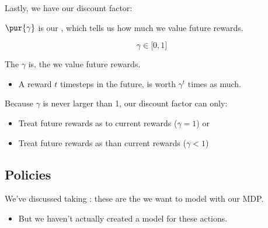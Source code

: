         Lastly, we have our discount factor:
            \\

        \begin{definition}
            $\pur{\gamma}$ is our , which tells us how much we value future rewards.

            \begin{equation*}
                \gamma \in \Big[ 0,1 \Big]
            \end{equation*}

            The  $\gamma$ is, the  we value future rewards.

            \begin{itemize}
                \item A reward $t$ timesteps in the future, is worth $\gamma^t$ times as much.
            \end{itemize}

            \subsecdiv

            Because $\gamma$ is never larger than 1, our discount factor can only:

            \begin{itemize}
                \item Treat future rewards as  to current rewards ($\gamma=1$) or

                \item Treat future rewards as  than current rewards ($\gamma<1$)
            \end{itemize}
        \end{definition}

    \pagebreak

    

    \subsection{Policies}

        We've discussed taking : these are the  we want to model with our MDP.

        \begin{itemize}
            \item But we haven't actually created a model for  these actions.
        \end{itemize}

